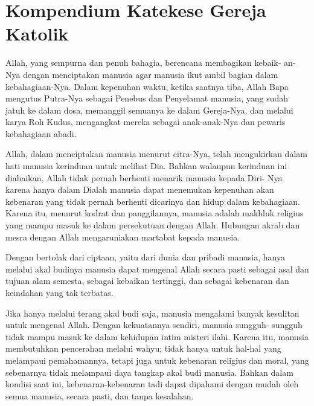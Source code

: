 \newpage
\section*{Kompendium Katekese Gereja Katolik}
\setcounter{kgkcounter}{0}
{\small
{}
Allah, yang sempurna dan penuh bahagia, berencana membagikan kebaik-
an-Nya dengan menciptakan manusia agar manusia ikut ambil bagian dalam
kebahagiaan-Nya. Dalam kepenuhan waktu, ketika saatnya tiba, Allah Bapa
mengutus Putra-Nya sebagai Penebus dan Penyelamat manusia, yang sudah
jatuh ke dalam dosa, memanggil semuanya ke dalam Gereja-Nya, dan melalui
karya Roh Kudus, mengangkat mereka sebagai anak-anak-Nya dan pewaris
kebahagiaan abadi.

Allah, dalam menciptakan manusia menurut citra-Nya, telah mengukirkan
dalam hati manusia kerinduan untuk melihat Dia. Bahkan walaupun kerinduan
ini diabaikan, Allah tidak pernah berhenti menarik manusia kepada Diri-
Nya karena hanya dalam Dialah manusia dapat menemukan kepenuhan akan
kebenaran yang tidak pernah berhenti dicarinya dan hidup dalam kebahagiaan.
Karena itu, menurut kodrat dan panggilannya, manusia adalah makhluk religius
yang mampu masuk ke dalam persekutuan dengan Allah. Hubungan akrab dan
mesra dengan Allah mengaruniakan martabat kepada manusia.

Dengan bertolak dari ciptaan, yaitu dari dunia dan pribadi manusia, hanya
melalui akal budinya manusia dapat mengenal Allah secara pasti sebagai asal
dan tujuan alam semesta, sebagai kebaikan tertinggi, dan sebagai kebenaran dan
keindahan yang tak terbatas.

Jika hanya melalui terang akal budi saja, manusia mengalami banyak
kesulitan untuk mengenal Allah. Dengan kekuatannya sendiri, manusia sungguh-
sungguh tidak mampu masuk ke dalam kehidupan intim misteri ilahi. Karena
itu, manusia membutuhkan pencerahan melalui wahyu; tidak hanya untuk
hal-hal yang melampaui pemahamannya, tetapi juga untuk kebenaran religius
dan moral, yang sebenarnya tidak melampaui daya tangkap akal budi manusia.
Bahkan dalam kondisi saat ini, kebenaran-kebenaran tadi dapat dipahami dengan
mudah oleh semua manusia, secara pasti, dan tanpa kesalahan.

}